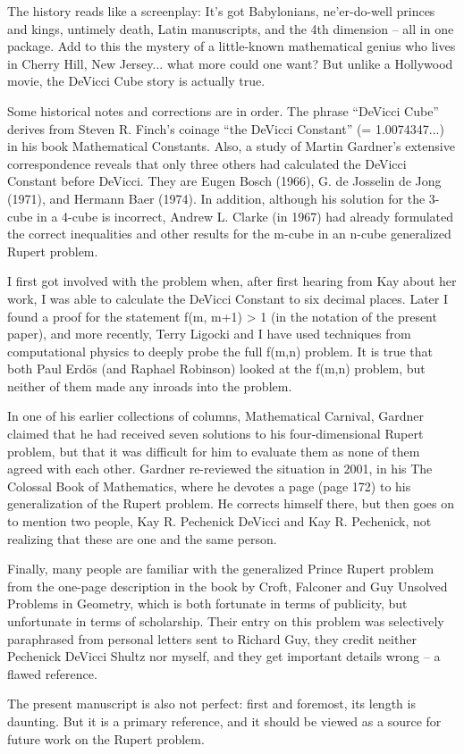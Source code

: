 The history reads like a screenplay: It's got Babylonians, ne'er-do-well
princes and kings, untimely death, Latin manuscripts, and the 4th dimension
-- all in one package. Add to this the mystery of a little-known mathematical
genius who lives in Cherry Hill, New Jersey... what more could one want? But
unlike a Hollywood movie, the DeVicci Cube story is actually true.

Some historical notes and corrections are in order. The phrase ``DeVicci
Cube'' derives from Steven R. Finch's coinage ``the DeVicci Constant''
(= 1.0074347...) in his book Mathematical Constants. Also, a study of Martin
Gardner's extensive correspondence reveals that only three others had
calculated the DeVicci Constant before DeVicci. They are Eugen Bosch (1966),
G. de Josselin de Jong (1971), and Hermann Baer (1974). In addition, although
his solution for the 3-cube in a 4-cube is incorrect, Andrew L. Clarke
(in 1967) had already formulated the correct inequalities and other results
for the m-cube in an n-cube generalized Rupert problem.

I first got involved with the problem when, after first hearing from Kay
about her work, I was able to calculate the DeVicci Constant to six decimal
places.  Later I found a proof for the statement f(m, m+1) > 1 (in the
notation of the present paper), and more recently, Terry Ligocki and I have
used techniques from computational physics to deeply probe the full f(m,n)
problem. It is true that both Paul Erd\"{o}s (and Raphael Robinson) looked at
the f(m,n) problem, but neither of them made any inroads into the problem.

In one of his earlier collections of columns, Mathematical Carnival, Gardner
claimed that he had received seven solutions to his four-dimensional Rupert
problem, but that it was difficult for him to evaluate them as none of them
agreed with each other. Gardner re-reviewed the situation in 2001, in his The
Colossal Book of Mathematics, where he devotes a page (page 172) to his
generalization of the Rupert problem. He corrects himself there, but then
goes on to mention two people, Kay R. Pechenick DeVicci and Kay R. Pechenick,
not realizing that these are one and the same person.

Finally, many people are familiar with the generalized Prince Rupert problem
from the one-page description in the book by Croft, Falconer and Guy Unsolved
Problems in Geometry, which is both fortunate in terms of publicity, but
unfortunate in terms of scholarship. Their entry on this problem was
selectively paraphrased from personal letters sent to Richard Guy, they
credit neither Pechenick DeVicci Shultz nor myself, and they get important
details wrong -- a flawed reference.

The present manuscript is also not perfect: first and foremost, its length is
daunting. But it is a primary reference, and it should be viewed as a source
for future work on the Rupert problem.
